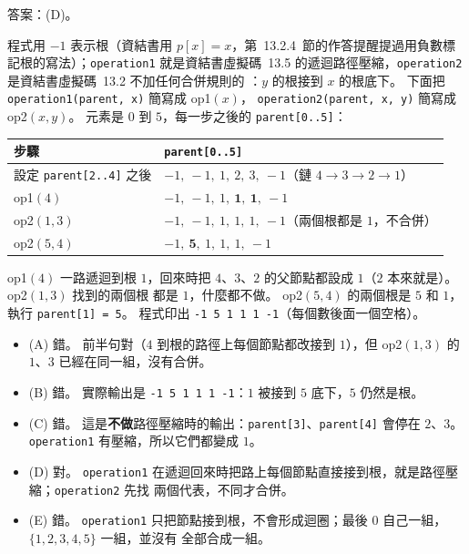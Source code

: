 \begin{pastsoln}
答案：(D)。

程式用 $-1$ 表示根（資結書用 $p[x] = x$，第~13.2.4~節的作答提醒提過用負數標記根的寫法）；\texttt{operation1}
就是資結書虛擬碼~13.5 的遞迴路徑壓縮，\texttt{operation2} 是資結書虛擬碼~13.2 不加任何合併規則的
：$y$ 的根接到 $x$ 的根底下。 下面把 \texttt{operation1(parent, x)} 簡寫成 op1$(x)$，
\texttt{operation2(parent, x, y)} 簡寫成 op2$(x, y)$。 元素是 $0$ 到 $5$，每一步之後的 \texttt{parent[0..5]}：
\begin{center}
\small
\begin{tabular}{ll}
\toprule
步驟 & \texttt{parent[0..5]} \\
\midrule
設定 \texttt{parent[2..4]} 之後 & $-1,\ -1,\ 1,\ 2,\ 3,\ -1$（鏈 $4 \to 3 \to 2 \to 1$） \\
op1$(4)$ & $-1,\ -1,\ 1,\ \mathbf{1},\ \mathbf{1},\ -1$ \\
op2$(1, 3)$ & $-1,\ -1,\ 1,\ 1,\ 1,\ -1$（兩個根都是 $1$，不合併） \\
op2$(5, 4)$ & $-1,\ \mathbf{5},\ 1,\ 1,\ 1,\ -1$ \\
\bottomrule
\end{tabular}
\end{center}
op1$(4)$ 一路遞迴到根 $1$，回來時把 $4$、$3$、$2$ 的父節點都設成 $1$（$2$ 本來就是）。 op2$(1, 3)$ 找到的兩個根
都是 $1$，什麼都不做。 op2$(5, 4)$ 的兩個根是 $5$ 和 $1$，執行 \texttt{parent[1] = 5}。 程式印出
\texttt{-1 5 1 1 1 -1}（每個數後面一個空格）。
\begin{itemize}
\item (A) 錯。 前半句對（$4$ 到根的路徑上每個節點都改接到 $1$），但 op2$(1, 3)$ 的 $1$、$3$ 已經在同一組，沒有合併。
\item (B) 錯。 實際輸出是 \texttt{-1 5 1 1 1 -1}：$1$ 被接到 $5$ 底下，$5$ 仍然是根。
\item (C) 錯。 這是\textbf{不做}路徑壓縮時的輸出：\texttt{parent[3]}、\texttt{parent[4]} 會停在 $2$、$3$。
\texttt{operation1} 有壓縮，所以它們都變成 $1$。
\item (D) 對。 \texttt{operation1} 在遞迴回來時把路上每個節點直接接到根，就是路徑壓縮；\texttt{operation2} 先找
兩個代表，不同才合併。
\item (E) 錯。 \texttt{operation1} 只把節點接到根，不會形成迴圈；最後 $0$ 自己一組，$\{1, 2, 3, 4, 5\}$ 一組，並沒有
全部合成一組。
\end{itemize}
\end{pastsoln}
